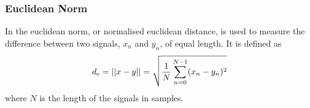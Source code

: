 \documentclass[../main2.tex]{subfiles}
\begin{document}
\subsubsection{Euclidean Norm}\label{metric_en}
In \cite{bitzer2006parameter} the euclidean norm, or normalised euclidean distance, is used to measure the difference between two signals, $x_n$ and $y_n$, of equal length. It is defined as
\begin{align}
d_\text{e} = ||x-y|| = \sqrt{\frac{1}{N}\sum_{n=0}^{N-1}(x_n-y_n)^2}
\end{align}
where $N$ is the length of the signals in samples.
\end{document}
